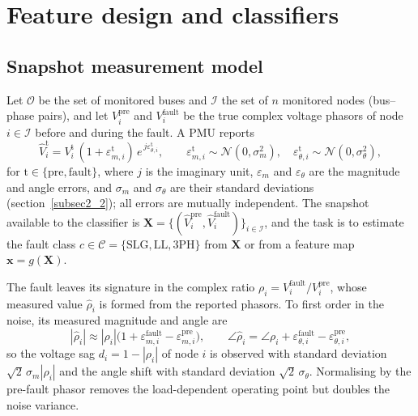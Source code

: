 \documentclass[11pt]{article}
\newenvironment{nw}{}{}
\begin{document}
\section{Feature design and classifiers}\label{sec3}

\begin{nw}
\subsection{Snapshot measurement model}\label{subsec3_0}

Let $\mathcal{O}$ be the set of monitored buses and $\mathcal{I}$ the set of $n$ monitored nodes (bus--phase pairs), and let $V^{\mathrm{pre}}_i$ and $V^{\mathrm{fault}}_i$ be the true complex voltage phasors of node $i\in\mathcal{I}$ before and during the fault. A PMU reports
\begin{equation}\label{eq_meas}
\hat V^{\mathrm{t}}_i = V^{\mathrm{t}}_i\,(1+\varepsilon^{\mathrm{t}}_{m,i})\,e^{\,j\varepsilon^{\mathrm{t}}_{\theta,i}},\qquad
\varepsilon^{\mathrm{t}}_{m,i}\sim\mathcal{N}(0,\sigma_m^2),\quad \varepsilon^{\mathrm{t}}_{\theta,i}\sim\mathcal{N}(0,\sigma_\theta^2),
\end{equation}
for $\mathrm{t}\in\{\mathrm{pre},\mathrm{fault}\}$, where $j$ is the imaginary unit, $\varepsilon_m$ and $\varepsilon_\theta$ are the magnitude and angle errors, and $\sigma_m$ and $\sigma_\theta$ are their standard deviations (section~\ref{subsec2_2}); all errors are mutually independent. The snapshot available to the classifier is $\mathbf{X}=\{(\hat V^{\mathrm{pre}}_i,\hat V^{\mathrm{fault}}_i)\}_{i\in\mathcal{I}}$, and the task is to estimate the fault class $c\in\mathcal{C}=\{\mathrm{SLG},\mathrm{LL},\mathrm{3PH}\}$ from $\mathbf{X}$ or from a feature map $\mathbf{x}=g(\mathbf{X})$.

The fault leaves its signature in the complex ratio $\rho_i=V^{\mathrm{fault}}_i/V^{\mathrm{pre}}_i$, whose measured value $\hat\rho_i$ is formed from the reported phasors. To first order in the noise, its measured magnitude and angle are
\begin{equation}\label{eq_ratio}
|\hat\rho_i|\approx|\rho_i|\big(1+\varepsilon^{\mathrm{fault}}_{m,i}-\varepsilon^{\mathrm{pre}}_{m,i}\big),\qquad
\angle\hat\rho_i=\angle\rho_i+\varepsilon^{\mathrm{fault}}_{\theta,i}-\varepsilon^{\mathrm{pre}}_{\theta,i},
\end{equation}
so the voltage sag $d_i=1-|\rho_i|$ of node $i$ is observed with standard deviation $\sqrt2\,\sigma_m|\rho_i|$ and the angle shift with standard deviation $\sqrt2\,\sigma_\theta$. Normalising by the pre-fault phasor removes the load-dependent operating point but doubles the noise variance.
\end{nw}
\end{document}
